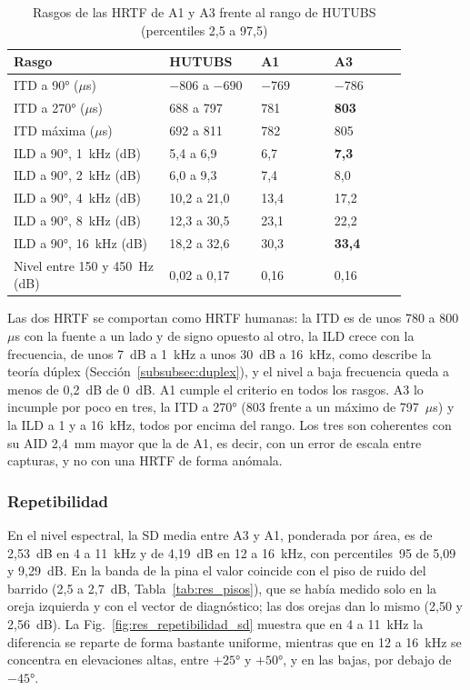 \begin{table}[H]
\centering
\small
\caption{Rasgos de las HRTF de A1 y A3 frente al rango de HUTUBS (percentiles 2,5 a 97,5)}
\label{tab:res_validez}
\begin{tabular}{p{0.34\linewidth}p{0.20\linewidth}p{0.16\linewidth}p{0.16\linewidth}}
\hline
Rasgo & HUTUBS & A1 & A3 \\
\hline
ITD a 90° ($\mu$s) & $-806$ a $-690$ & $-769$ & $-786$ \\
ITD a 270° ($\mu$s) & 688 a 797 & 781 & \textbf{803} \\
ITD máxima ($\mu$s) & 692 a 811 & 782 & 805 \\
ILD a 90°, 1~kHz (dB) & 5,4 a 6,9 & 6,7 & \textbf{7,3} \\
ILD a 90°, 2~kHz (dB) & 6,0 a 9,3 & 7,4 & 8,0 \\
ILD a 90°, 4~kHz (dB) & 10,2 a 21,0 & 13,4 & 17,2 \\
ILD a 90°, 8~kHz (dB) & 12,3 a 30,5 & 23,1 & 22,2 \\
ILD a 90°, 16~kHz (dB) & 18,2 a 32,6 & 30,3 & \textbf{33,4} \\
Nivel entre 150 y 450~Hz (dB) & 0,02 a 0,17 & 0,16 & 0,16 \\
\hline
\end{tabular}
\end{table}

Las dos HRTF se comportan como HRTF humanas: la ITD es de unos 780 a 800~$\mu$s con la fuente a un lado y de signo opuesto al otro, la ILD crece con la frecuencia, de unos 7~dB a 1~kHz a unos 30~dB a 16~kHz, como describe la teoría dúplex (Sección~\ref{subsubsec:duplex}), y el nivel a baja frecuencia queda a menos de 0,2~dB de 0~dB. A1 cumple el criterio en todos los rasgos. A3 lo incumple por poco en tres, la ITD a 270° (803 frente a un máximo de 797~$\mu$s) y la ILD a 1 y a 16~kHz, todos por encima del rango. Los tres son coherentes con su AID 2,4~mm mayor que la de A1, es decir, con un error de escala entre capturas, y no con una HRTF de forma anómala.

\subsubsection{Repetibilidad}
\label{subsubsec:res_repetibilidad_eval}

En el nivel espectral, la SD media entre A3 y A1, ponderada por área, es de 2,53~dB en 4 a 11~kHz y de 4,19~dB en 12 a 16~kHz, con percentiles~95 de 5,09 y 9,29~dB. En la banda de la pina el valor coincide con el piso de ruido del barrido (2,5 a 2,7~dB, Tabla~\ref{tab:res_pisos}), que se había medido solo en la oreja izquierda y con el vector de diagnóstico; las dos orejas dan lo mismo (2,50 y 2,56~dB). La Fig.~\ref{fig:res_repetibilidad_sd} muestra que en 4 a 11~kHz la diferencia se reparte de forma bastante uniforme, mientras que en 12 a 16~kHz se concentra en elevaciones altas, entre $+25$° y $+50$°, y en las bajas, por debajo de $-45$°.

